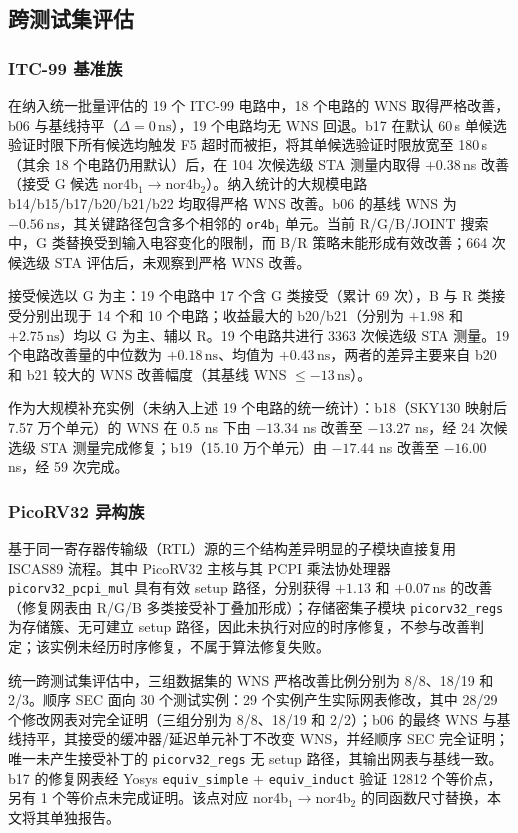 \documentclass[twocolumn,10pt,fontset=windows]{ctexart}
\begin{document}
\subsection{跨测试集评估}\label{sec:ood}

\subsubsection{ITC-99 基准族}\label{sec:itc99}

在纳入统一批量评估的 19 个 ITC-99 电路中，18 个电路的 WNS 取得严格改善，b06 与基线持平（$\Delta = 0\,\text{ns}$），19 个电路均无 WNS 回退。b17 在默认 60\,s 单候选验证时限下所有候选均触发 F5 超时而被拒，将其单候选验证时限放宽至 180\,s（其余 18 个电路仍用默认）后，在 104 次候选级 STA 测量内取得 $+0.38\,$ns 改善（接受 G 候选 nor4b$_1\!\to\!$nor4b$_2$）。纳入统计的大规模电路 b14/b15/b17/b20/b21/b22 均取得严格 WNS 改善。b06 的基线 WNS 为 $-0.56\,\text{ns}$，其关键路径包含多个相邻的 \texttt{or4b$_1$} 单元。当前 R/G/B/JOINT 搜索中，G 类替换受到输入电容变化的限制，而 B/R 策略未能形成有效改善；664 次候选级 STA 评估后，未观察到严格 WNS 改善。

接受候选以 G 为主：19 个电路中 17 个含 G 类接受（累计 69 次），B 与 R 类接受分别出现于 14 个和 10 个电路；收益最大的 b20/b21（分别为 $+1.98$ 和 $+2.75\,\text{ns}$）均以 G 为主、辅以 R。19 个电路共进行 3363 次候选级 STA 测量。19 个电路改善量的中位数为 $+0.18\,\text{ns}$、均值为 $+0.43\,\text{ns}$，两者的差异主要来自 b20 和 b21 较大的 WNS 改善幅度（其基线 WNS $\le -13\,\text{ns}$）。

作为大规模补充实例（未纳入上述 19 个电路的统一统计）：b18（SKY130 映射后 7.57 万个单元）的 WNS 在 0.5 ns 下由 $-13.34$ ns 改善至 $-13.27$ ns，经 24 次候选级 STA 测量完成修复；b19（15.10 万个单元）由 $-17.44$ ns 改善至 $-16.00$ ns，经 59 次完成。

\subsubsection{PicoRV32 异构族}

基于同一寄存器传输级（RTL）源的三个结构差异明显的子模块直接复用 ISCAS89 流程。其中 PicoRV32 主核与其 PCPI 乘法协处理器 \texttt{picorv32\_pcpi\_mul} 具有有效 setup 路径，分别获得 $+1.13$ 和 $+0.07\,$ns 的改善（修复网表由 R/G/B 多类接受补丁叠加形成）；存储密集子模块 \texttt{picorv32\_regs} 为存储簇、无可建立 setup 路径，因此未执行对应的时序修复，不参与改善判定；该实例未经历时序修复，不属于算法修复失败。

统一跨测试集评估中，三组数据集的 WNS 严格改善比例分别为 8/8、18/19 和 2/3。顺序 SEC 面向 30 个测试实例：29 个实例产生实际网表修改，其中 28/29 个修改网表对完全证明（三组分别为 8/8、18/19 和 2/2）；b06 的最终 WNS 与基线持平，其接受的缓冲器/延迟单元补丁不改变 WNS，并经顺序 SEC 完全证明；唯一未产生接受补丁的 \texttt{picorv32\_regs} 无 setup 路径，其输出网表与基线一致。b17 的修复网表经 Yosys \texttt{equiv\_simple} + \texttt{equiv\_induct} 验证 12812 个等价点，另有 1 个等价点未完成证明。该点对应 nor4b$_1\!\to\!$nor4b$_2$ 的同函数尺寸替换，本文将其单独报告。
\end{document}
